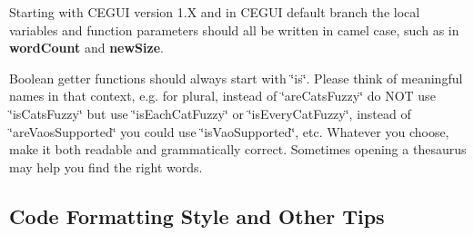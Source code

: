 \begin{DoxyItemize}
\item Starting with C\+E\+G\+UI version 1.\+X and in C\+E\+G\+UI default branch the local variables and function parameters should all be written in camel case, such as in {\bfseries{word\+Count}} and {\bfseries{new\+Size}}.
\item Boolean getter functions should always start with \char`\"{}is\char`\"{}. Please think of meaningful names in that context, e.\+g. for plural, instead of \char`\"{}are\+Cats\+Fuzzy\char`\"{} do N\+OT use \char`\"{}is\+Cats\+Fuzzy\char`\"{} but use \char`\"{}is\+Each\+Cat\+Fuzzy\char`\"{} or \char`\"{}is\+Every\+Cat\+Fuzzy\char`\"{}, instead of \char`\"{}are\+Vaos\+Supported\char`\"{} you could use \char`\"{}is\+Vao\+Supported\char`\"{}, etc. Whatever you choose, make it both readable and grammatically correct. Sometimes opening a thesaurus may help you find the right words.
\end{DoxyItemize}\hypertarget{code_standards_code_standards_sec_2_2}{}\subsection{Code Formatting Style and Other Tips}\label{code_standards_code_standards_sec_2_2}

